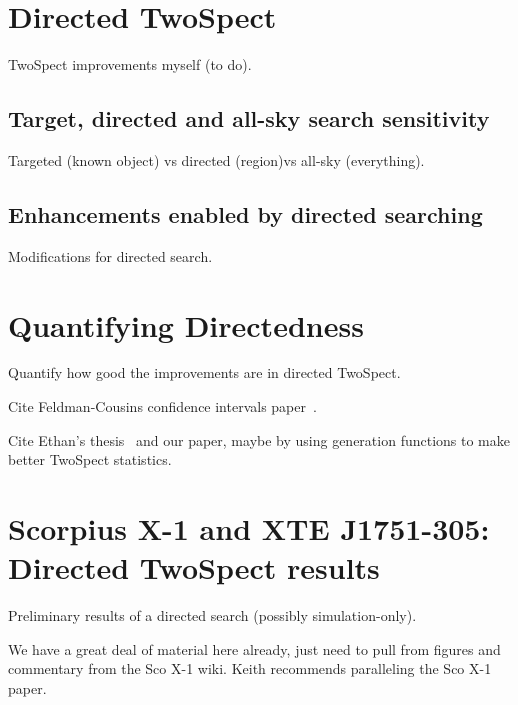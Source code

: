 


        

        \section{Directed TwoSpect}
        \label{directed}

            TwoSpect improvements myself (to do).

            \subsection{Target, directed and all-sky search sensitivity}
            \label{tradeoffs}

                Targeted (known object) vs directed (region)vs all-sky (everything).

            \subsection{Enhancements enabled by directed searching}
            \label{directed_enhancements}

                Modifications for directed search.

        \section{Quantifying Directedness}
        \label{quant_directed}



        
            Quantify how good the improvements are in directed TwoSpect. 

            Cite Feldman-Cousins confidence intervals paper~\cite{FeldmanCousins1998}.

            Cite Ethan's thesis~\cite{RomeroThesis} and our paper, maybe by using generation functions to make better TwoSpect statistics.

        \section{Scorpius X-1 and XTE J1751-305: Directed TwoSpect results}
        \label{directed_results}
 
            Preliminary results of a directed search (possibly simulation-only).

            We have a great deal of material here already, just need to pull from figures and commentary from the Sco X-1 wiki. Keith recommends paralleling the Sco X-1 paper.


